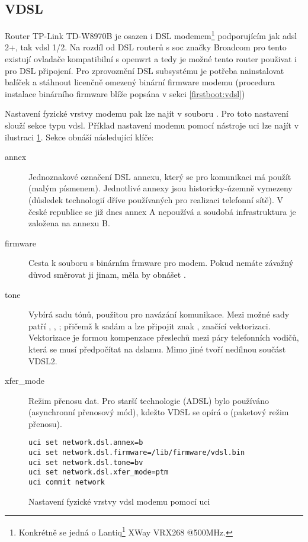 \subsection{VDSL}
\label{net:vdsl}
Router TP-Link TD-W8970B je osazen i DSL modemem\footnote{
Konkrétně se jedná o Lantiq\footnote{Značka Lantiq dnes vystupuje jako součást značky Intel.}
XWay VRX268 @500MHz.} podporujícím jak \gls{adsl} 2+,
tak \gls{vdsl} 1/2. Na rozdíl od DSL routerů s \gls{soc} značky Broadcom
pro tento existují ovladače kompatibilní s \gls{openwrt} a tedy je možné tento
router použivat i pro DSL připojení. Pro zprovoznění DSL subsystému je potřeba
nainstalovat balíček  a stáhnout licenčně omezený binární
firmware modemu (procedura instalace binárního firmware blíže popsána v
sekci \ref{firstboot:vdsl})

Nastavení fyzické vrstvy modemu pak lze najít v souboru .
Pro toto nastavení slouží sekce typu vdsl. Příklad nastavení modemu pomocí
nástroje uci lze najít v ilustraci \ref{net:vdsl:phy}. Sekce obnáší následující
klíče:
\begin{description}
\item[annex] Jednoznakové označení DSL annexu, který se pro komunikaci má
použít (malým písmenem). Jednotlivé annexy jsou historicky-územně vymezeny
(důsledek technologií dříve používaných pro realizaci telefonní sítě). V
české republice se již dnes annex A nepoužívá a soudobá infrastruktura je
založena na annexu B.
\item[firmware] Cesta k souboru s binárním frmware pro modem. Pokud nemáte
závažný důvod směrovat ji jinam, měla by obnášet .
\item[tone] Vybírá sadu tónů, použitou pro navázání komunikace. Mezi možné
sady patří , , ; přičemž
k sadám  a  lze připojit znak , značící vektorizaci.
Vektorizace je formou kompenzace přeslechů mezi páry telefonních vodičů,
která se musí předpočítat na \gls{dslam}u. Mimo jiné tvoří nedílnou součást VDSL2.
\item[xfer\_mode] Režim přenosu dat. Pro starší technologie (ADSL) bylo
používáno  (asynchronní přenosový mód), kdežto VDSL se opírá o 
(paketový režim přenosu).
\end{description}
\begin{figure}
\begin{lstlisting}
uci set network.dsl.annex=b
uci set network.dsl.firmware=/lib/firmware/vdsl.bin
uci set network.dsl.tone=bv
uci set network.dsl.xfer_mode=ptm
uci commit network
\end{lstlisting}
\caption{Nastavení fyzické vrstvy \gls{vdsl} modemu pomocí uci}
\label{net:vdsl:phy}
\end{figure}

